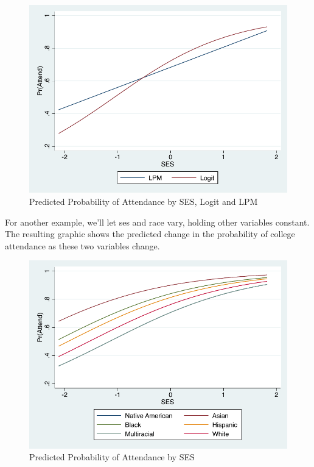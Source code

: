 \documentclass[12pt]{article}
\begin{document}
\begin{figure}[h]
  \centering
  \includegraphics[width=\textwidth]{logit_basic}
  \caption{Predicted Probability of Attendance by SES, Logit and LPM}
\end{figure}


For another example, we'll let ses and race vary, holding other
variables constant. The resulting graphic shows the predicted change
in the probability of college attendance as these two variables
change. 


\begin{figure}[h]
  \centering
  \includegraphics[width=\textwidth]{logit_race}
  \caption{Predicted Probability of Attendance by SES}
\end{figure}
\end{document}
